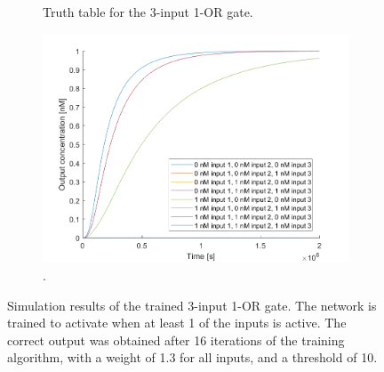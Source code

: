 \begin{figure}[H]
\begin{subfigure}[t]{.49\columnwidth}
\begin{tabular}[b]{cccc}
    \hline
    \end{tabular}
    \caption{Truth table for the 3-input 1-OR gate.}
    \label{and_table}
\end{subfigure}
\hfill
\begin{subfigure}[t]{.49\columnwidth}
  \centering
\includegraphics[width=\linewidth]{images/or_1_simulation_3input.png}
\caption{.}
\label{}
\end{subfigure}
\caption{Simulation results of the trained 3-input 1-OR gate. The network is trained to activate when at least 1 of the inputs is active. The correct output was obtained after 16 iterations of the training algorithm, with a weight of 1.3 for all inputs, and a threshold of 10.}
\end{figure}

